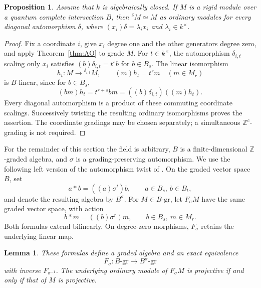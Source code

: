 \documentclass[11pt,a4paper]{article}
\numberwithin{equation}{section}
\theoremstyle{definition}
\theoremstyle{plain}
\newtheorem{proposition}[definition]{Proposition}
\newtheorem{lemma}[definition]{Lemma}
\theoremstyle{remark}
\newcommand{\Z}{\mathbb Z}
\newcommand{\gmod}[1]{#1\text{-}\mathrm{gr}}
\newcommand{\tw}[2]{{}^{#1}\!#2}
\begin{document}
\begin{proposition}\label{prop:diagonal}
Assume that \(k\) is algebraically closed. If \(M\) is a rigid module
over a quantum complete intersection \(B\), then
\(\tw{\delta}{M}\simeq M\) as ordinary modules for every diagonal
automorphism \(\delta\), where \((x_i)\delta=\lambda_i x_i\) and
\(\lambda_i\in k^\times\).
\end{proposition}

\begin{proof}
Fix a coordinate \(i\), give \(x_i\) degree one and the other generators
degree zero, and apply Theorem~\ref{thm:AO} to grade \(M\).
For \(t\in k^\times\), the automorphism \(\delta_{i,t}\) scaling only
\(x_i\) satisfies \((b)\delta_{i,t}=t^s b\) for \(b\in B_s\).
The linear isomorphism
\[
 h_t:M\longrightarrow\tw{\delta_{i,t}}{M},
 \qquad (m)h_t=t^r m\quad(m\in M_r)
\]
is \(B\)-linear, since for \(b\in B_s\),
\[
 (bm)h_t=t^{r+s}bm
 =((b)\delta_{i,t})((m)h_t).
\]
Every diagonal automorphism is a product of these commuting coordinate
scalings. Successively twisting the resulting ordinary isomorphisms
proves the assertion. The coordinate gradings may be chosen separately;
a simultaneous \(\Z^c\)-grading is not required.
\end{proof}

For the remainder of this section the field is arbitrary, \(B\) is a
finite-dimensional \(\Z\)-graded algebra, and \(\sigma\) is a
grading-preserving automorphism. We use the following left version of
the automorphism twist of \cite{Zhang96}. On the graded vector space
\(B\), set
\begin{equation*}
 a*b=((a)\sigma^t)b,
 \qquad a\in B_s,\ b\in B_t,
\end{equation*}
and denote the resulting algebra by \(B^\sigma\).
For \(M\in\gmod{B}\), let \(F_\sigma M\) have the same graded vector
space, with action
\begin{equation*}
 b*m=((b)\sigma^r)m,
 \qquad b\in B_s,\ m\in M_r.
\end{equation*}
Both formulas extend bilinearly. On degree-zero morphisms,
\(F_\sigma\) retains the underlying linear map.

\begin{lemma}\label{lem:twist-equivalence}
These formulas define a graded algebra and an exact equivalence
\[
 F_\sigma:\gmod{B}\longrightarrow\gmod{B^\sigma}
\]
with inverse \(F_{\sigma^{-1}}\). The underlying ordinary module of
\(F_\sigma M\) is projective if and only if that of \(M\) is projective.
\end{lemma}
\end{document}
